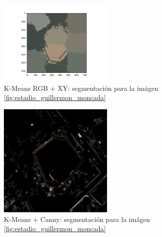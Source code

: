 \documentclass[article]{llncs}
\begin{document}
\begin{figure}[h]
  \centering
  \includegraphics[width=0.5\textwidth]{Figure_2.png}
  \caption{K-Means RGB + XY: segmentación para la im\'agen \ref{fig:estadio_guillermon_moncada}}
  \label{fig:Figure_2}
\end{figure}

\begin{figure}[h]
  \centering
  \includegraphics[width=0.5\textwidth]{canny.png}
  \caption{K-Means + Canny: segmentación para la im\'agen \ref{fig:estadio_guillermon_moncada}}
  \label{fig:canny}
\end{figure}
\end{document}
